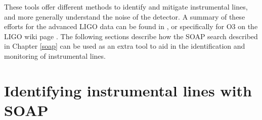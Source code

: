 \begin{description}
	
\end{description}


These tools offer different methods to identify and mitigate instrumental lines, and more generally understand the noise of the detector. A summary of these efforts for
the advanced \gls{LIGO} data can be found in
\citep{covas2018IdentificationMitigation}, or specifically for O3 on the \gls{LIGO} wiki page \citep{O3Lines}. The following
sections describe how the SOAP search described in Chapter \ref{soap} can be used
as an extra tool to aid in the identification and monitoring of instrumental
lines.


\section{\label{detchar:soap}Identifying instrumental lines with SOAP}

